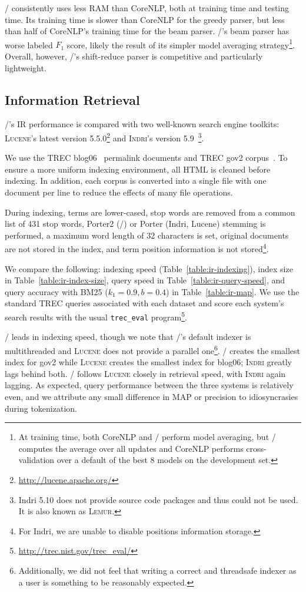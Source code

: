\meta/ consistently uses less RAM than CoreNLP, both at training
time and testing time. Its training time is slower than CoreNLP
for the greedy parser, but less than half of CoreNLP's training time for
the beam parser. \meta/'s beam parser has worse labeled $F_1$ score, likely
the result of its simpler model averaging strategy\footnote{At training
time, both CoreNLP and \meta/ perform model averaging, but \meta/
computes the average over all updates and CoreNLP performs
cross-validation over a default of the best 8 models on the development
set.}. Overall, however, \meta/'s shift-reduce parser is competitive and
particularly lightweight.

\subsection{Information Retrieval}

\meta/'s IR performance is compared with two well-known search engine toolkits:
\textsc{Lucene}'s latest version 5.5.0\footnote{\url{http://lucene.apache.org/}} and
\textsc{Indri}'s version 5.9~\citep{lemur}\footnote{Indri 5.10 does not
provide source code packages and thus could not be used. It is also known
as \textsc{Lemur}.}.

We use the TREC blog06~\citep{blog06} permalink documents and TREC gov2
corpus~\citep{gov2}. To ensure a more uniform indexing environment, all
HTML is cleaned before indexing. In addition, each corpus is converted into
a single file with one document per line to reduce the effects of many file
operations.

During indexing, terms are lower-cased, stop words are removed from a common
list of 431 stop words, Porter2 (\meta/) or Porter (Indri, Lucene) stemming is
performed, a maximum word length of 32 characters is set, original documents are
not stored in the index, and term position information is not
stored\footnote{For Indri, we are unable to disable positions information
storage.}.

We compare the following: indexing speed (Table~\ref{table:ir-indexing}), index
size in Table~\ref{table:ir-index-size}, query speed in
Table~\ref{table:ir-query-speed}, and query accuracy with BM25 ($k_1=0.9,
b=0.4$) in Table~\ref{table:ir-map}. We use the standard TREC queries associated
with each dataset and score each system's search results with the usual
\texttt{trec\_eval} program\footnote{\url{http://trec.nist.gov/trec_eval/}}.

\meta/ leads in indexing speed, though we note that \meta/'s default
indexer is multithreaded and \textsc{Lucene} does not provide a parallel
one\footnote{Additionally, we did not feel that writing a correct and threadsafe
indexer as a user is something to be reasonably expected.}. \meta/ creates the
smallest index for gov2 while \textsc{Lucene} creates the smallest index for
blog06; \textsc{Indri} greatly lags behind both. \meta/ follows \textsc{Lucene}
closely in retrieval speed, with \textsc{Indri} again lagging. As expected,
query performance between the three systems is relatively even, and we attribute
any small difference in MAP or precision to idiosyncrasies during tokenization.

